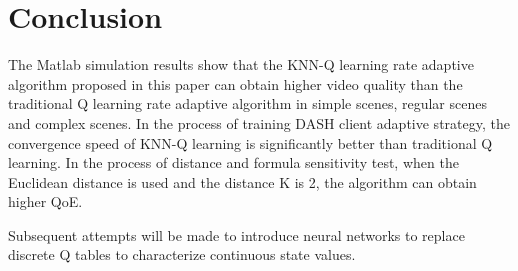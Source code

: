 \documentclass[twocolumn]{article}
\begin{document}
\section{Conclusion}
The Matlab simulation results show that the KNN-Q learning rate adaptive 
algorithm proposed in this paper can obtain higher video quality than 
the traditional Q learning rate adaptive algorithm in simple scenes, regular 
scenes and complex scenes. In the process of training DASH client adaptive strategy, 
the convergence speed of KNN-Q learning is significantly better than traditional Q learning. 
In the process of distance and formula sensitivity test, when the Euclidean distance is used
and the distance K is 2, the algorithm can obtain higher QoE.

Subsequent attempts will be made to introduce neural networks to 
replace discrete Q tables to characterize continuous state values.


\bigskip
\end{document}

